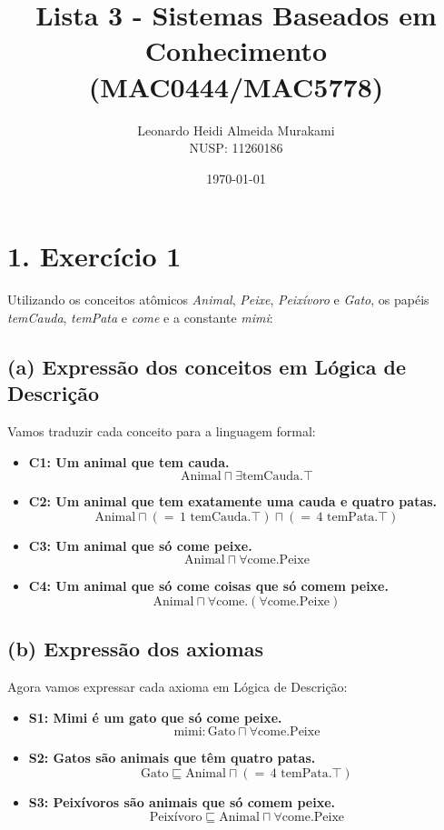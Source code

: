\documentclass{article}
\title{Lista 3 - Sistemas Baseados em Conhecimento (MAC0444/MAC5778)}
\author{Leonardo Heidi Almeida Murakami \\ NUSP: 11260186}
\date{\today}
\begin{document}
\maketitle

\section*{1. Exercício 1}

Utilizando os conceitos atômicos \textit{Animal}, \textit{Peixe}, \textit{Peixívoro} e \textit{Gato}, os papéis \textit{temCauda}, \textit{temPata} e \textit{come} e a constante \textit{mimi}:

\subsection*{(a) Expressão dos conceitos em Lógica de Descrição}

Vamos traduzir cada conceito para a linguagem formal:

\begin{itemize}[leftmargin=*, itemsep=1em]
    \item \textbf{C1: Um animal que tem cauda.}
    \[
        \text{Animal} \sqcap \exists \text{temCauda}.\top
    \]
    
    \item \textbf{C2: Um animal que tem exatamente uma cauda e quatro patas.}
    \[
        \text{Animal} \sqcap ({=}\,1\text{ temCauda}.\top) \sqcap ({=}\,4\text{ temPata}.\top)
    \]
    
    \item \textbf{C3: Um animal que só come peixe.}
    \[
        \text{Animal} \sqcap \forall \text{come}.\text{Peixe}
    \]
    
    \item \textbf{C4: Um animal que só come coisas que só comem peixe.}
    \[
        \text{Animal} \sqcap \forall \text{come}.(\forall \text{come}.\text{Peixe})
    \]
\end{itemize}

\subsection*{(b) Expressão dos axiomas}

Agora vamos expressar cada axioma em Lógica de Descrição:

\begin{itemize}[leftmargin=*, itemsep=1em]
    \item \textbf{S1: Mimi é um gato que só come peixe.}
    \[
        \text{mimi} : \text{Gato} \sqcap \forall \text{come}.\text{Peixe}
    \]
    
    \item \textbf{S2: Gatos são animais que têm quatro patas.}
    \[
        \text{Gato} \sqsubseteq \text{Animal} \sqcap ({=}\,4\text{ temPata}.\top)
    \]
    
    \item \textbf{S3: Peixívoros são animais que só comem peixe.}
    \[
        \text{Peixívoro} \sqsubseteq \text{Animal} \sqcap \forall \text{come}.\text{Peixe}
    \]
\end{itemize}
\end{document}
